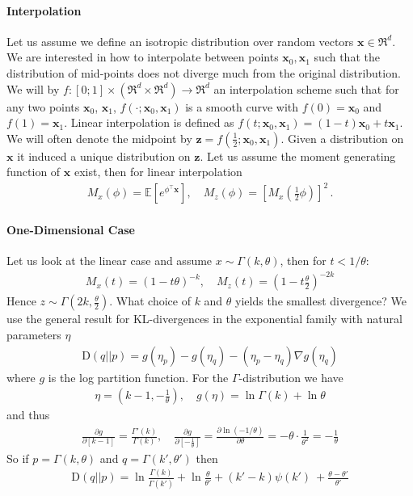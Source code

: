 \documentclass{article}
\newcommand{\x}{{\mathbf x}}
\newcommand{\z}{{\mathbf z}}
\newcommand{\expect}[1]{{\mathbb E}\left[{#1}\right]}
\begin{document}
\newpage



\paragraph{Interpolation}  Let us assume we define an isotropic distribution over random vectors $\x \in \Re^d$. We are interested in how to interpolate between points $\x_0, \x_1$ such that the distribution of mid-points does not diverge much from the original distribution. We will by $f: [0;1] \times (\Re^d \times \Re^d) \to \Re^d$ an interpolation scheme such that for any two points $\x_0$, $\x_1$, $f(\cdot; \x_0,\x_1)$ is a smooth curve with $f(0)= \x_0$ and $f(1) = \x_1$. Linear interpolation is defined as $f(t; \x_0,\x_1)= (1-t) \x_0 + t \x_1$. We will often denote the midpoint by $\z = f(\tfrac 12; \x_0,\x_1)$. Given a distribution on $\x$ it induced a unique distribution on $\z$. Let us assume the moment generating function of $\x$ exist, then for linear interpolation 
\begin{align}
M_x(\phi) = \expect{e^{\phi^\top \x}}, \quad M_z(\phi) = \left[ M_x(\tfrac 12\phi)  \right]^2 \,.
\end{align}

\paragraph{One-Dimensional Case} Let us look at the linear case and assume $x \sim \Gamma(k,\theta)$, then for $t < 1/\theta$:
\begin{align}
M_x(t) = (1-t\theta)^{-k} , \quad M_z(t) = \left(1-t \frac \theta 2 \right)^{-2k}
\end{align} 
Hence $z \sim \Gamma(2k,\tfrac \theta 2)$. What choice of $k$ and $\theta$ yields the smallest divergence? We use the general result for KL-divergences in the exponential family with natural parameters $\eta$
\begin{align}
\text{D}(q||p) = g(\eta_p) - g(\eta_q) - (\eta_p - \eta_q) \nabla g(\eta_q)
\end{align}
where $g$ is the log partition function. For the $\Gamma$-distribution we have
\begin{align}
\eta = (k-1, - \tfrac 1 \theta), \quad g(\eta) = \ln\Gamma(k)+\ln \theta
\end{align}
and thus 
\begin{align}
\frac{\partial g}{\partial [k-1]} = \frac{\Gamma'(k)}{\Gamma(k)}, \quad 
\frac{\partial g}{\partial [-\tfrac 1\theta]} = \frac{\partial \ln(-1/\theta)}{\partial \theta} = - \theta \cdot \frac 1{\theta^2} = - \frac 1 \theta
\end{align}
So if $p= \Gamma(k,\theta)$ and $q= \Gamma(k',\theta')$ then 
\begin{align}
\text{D}(q||p) = \ln \frac{\Gamma(k)}{\Gamma(k')} + \ln \frac{\theta}{\theta'} + (k'-k) \psi(k') \
+ \frac{\theta - \theta'}{\theta'}
\end{align}
\end{document}
